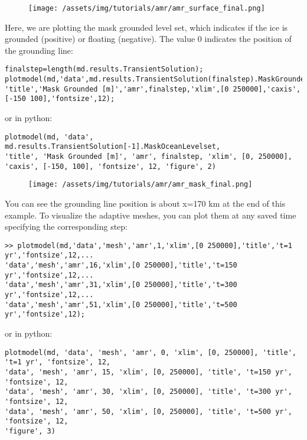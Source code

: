 \begin{figure}[H]
	\begin{center}
		\texttt{[image: /assets/img/tutorials/amr/amr\_surface\_final.png]}
	\end{center}
\end{figure}

Here, we are plotting the mask grounded level set, which indicates if the ice is grounded (positive) or floating (negative). The value 0 indicates the position of the grounding line:
\begin{verbatim}finalstep=length(md.results.TransientSolution);
plotmodel(md,'data',md.results.TransientSolution(finalstep).MaskGroundediceLevelset,...
'title','Mask Grounded [m]','amr',finalstep,'xlim',[0 250000],'caxis',[-150 100],'fontsize',12);\end{verbatim}
or in python:
\begin{verbatim}plotmodel(md, 'data', md.results.TransientSolution[-1].MaskOceanLevelset,
'title', 'Mask Grounded [m]', 'amr', finalstep, 'xlim', [0, 250000], 'caxis', [-150, 100], 'fontsize', 12, 'figure', 2)\end{verbatim}

\begin{figure}[H]
	\begin{center}
		\texttt{[image: /assets/img/tutorials/amr/amr\_mask\_final.png]}
	\end{center}
\end{figure}

You can see the grounding line position is about x=170 km at the end of this example. To visualize the adaptive meshes, you can plot them at any saved time specifying the corresponding step:
\begin{verbatim}>> plotmodel(md,'data','mesh','amr',1,'xlim',[0 250000],'title','t=1 yr','fontsize',12,...
'data','mesh','amr',16,'xlim',[0 250000],'title','t=150 yr','fontsize',12,...
'data','mesh','amr',31,'xlim',[0 250000],'title','t=300 yr','fontsize',12,...
'data','mesh','amr',51,'xlim',[0 250000],'title','t=500 yr','fontsize',12);\end{verbatim}
or in python:
\begin{verbatim}plotmodel(md, 'data', 'mesh', 'amr', 0, 'xlim', [0, 250000], 'title', 't=1 yr', 'fontsize', 12,
'data', 'mesh', 'amr', 15, 'xlim', [0, 250000], 'title', 't=150 yr', 'fontsize', 12,
'data', 'mesh', 'amr', 30, 'xlim', [0, 250000], 'title', 't=300 yr', 'fontsize', 12,
'data', 'mesh', 'amr', 50, 'xlim', [0, 250000], 'title', 't=500 yr', 'fontsize', 12,
'figure', 3)\end{verbatim}

